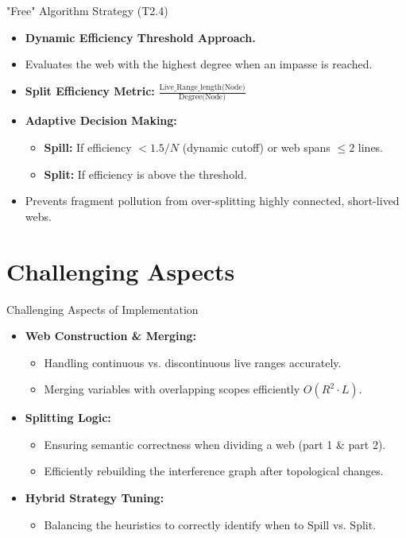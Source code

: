 \documentclass{beamer}
\begin{document}
\begin{frame}{"Free" Algorithm Strategy (T2.4)}
    \begin{itemize}
        \item \textbf{Dynamic Efficiency Threshold Approach.}
        \item Evaluates the web with the highest degree when an impasse is reached.
        \item \textbf{Split Efficiency Metric:} $\frac{\text{Live\_Range\_length(Node)}}{\text{Degree(Node)}}$
        \item \textbf{Adaptive Decision Making:}
        \begin{itemize}
            \item \textbf{Spill:} If efficiency $< 1.5 / N$ (dynamic cutoff) or web spans $\le 2$ lines.
            \item \textbf{Split:} If efficiency is above the threshold.
        \end{itemize}
        \item Prevents fragment pollution from over-splitting highly connected, short-lived webs.
    \end{itemize}
\end{frame}

\section{Challenging Aspects}
\begin{frame}{Challenging Aspects of Implementation}
    \begin{itemize}
        \item \textbf{Web Construction \& Merging:} 
        \begin{itemize}
            \item Handling continuous vs. discontinuous live ranges accurately.
            \item Merging variables with overlapping scopes efficiently $O(R^2 \cdot L)$.
        \end{itemize}
        \item \textbf{Splitting Logic:} 
        \begin{itemize}
            \item Ensuring semantic correctness when dividing a web (part 1 \& part 2).
            \item Efficiently rebuilding the interference graph after topological changes.
        \end{itemize}
        \item \textbf{Hybrid Strategy Tuning:} 
        \begin{itemize}
            \item Balancing the heuristics to correctly identify when to Spill vs. Split.
        \end{itemize}
    \end{itemize}
\end{frame}
\end{document}
